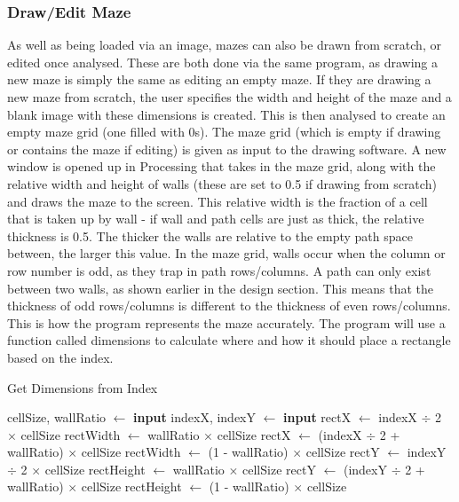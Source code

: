 \documentclass[titlepage]{article}
\begin{document}
\subsubsection{Draw/Edit Maze}
As well as being loaded via an image, mazes can also be drawn from scratch, or edited once analysed. These are both done via the same program, as drawing a new maze is simply the same as editing an empty maze. If they are drawing a new maze from scratch, the user specifies the width and height of the maze and a blank image with these dimensions is created. This is then analysed to create an empty maze grid (one filled with 0s). The maze grid (which is empty if drawing or contains the maze if editing) is given as input to the drawing software. A new window is opened up in Processing that takes in the maze grid, along with the relative width and height of walls (these are set to 0.5 if drawing from scratch) and draws the maze to the screen. This relative width is the fraction of a cell that is taken up by wall - if wall and path cells are just as thick, the relative thickness is 0.5. The thicker the walls are relative to the empty path space between, the larger this value. In the maze grid, walls occur when the column or row number is odd, as they trap in path rows/columns. A path can only exist between two walls, as shown earlier in the design section. This means that the thickness of odd rows/columns is different to the thickness of even rows/columns. This is how the program represents the maze accurately. The program will use a function called dimensions to calculate where and how it should place a rectangle based on the index.

\begin{algorithm}[H]
\caption{Get Dimensions from Index}
\begin{algorithmic}[1]
    	\State cellSize, wallRatio $\gets$ \textbf{input}
    	\State indexX, indexY $\gets$ \textbf{input}
		\State rectX $\gets$ indexX $\div$ 2 $\times$ cellSize
		\State rectWidth $\gets$ wallRatio $\times$ cellSize
	\Else
		\State rectX $\gets$ (indexX $\div$ 2 + wallRatio) $\times$ cellSize
		\State rectWidth $\gets$ (1 - wallRatio) $\times$ cellSize
	\EndIf
		\State rectY $\gets$ indexY $\div$ 2 $\times$ cellSize
		\State rectHeight $\gets$ wallRatio $\times$ cellSize
	\Else
		\State rectY $\gets$ (indexY $\div$ 2 + wallRatio) $\times$ cellSize
		\State rectHeight $\gets$ (1 - wallRatio) $\times$ cellSize
	\EndIf
\end{algorithmic}
\end{algorithm}
\end{document}
